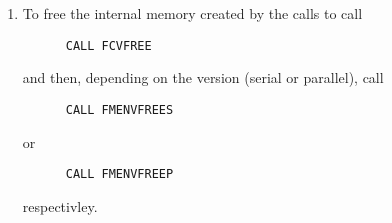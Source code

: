 \begin{enumerate}
\item
  To free the internal memory created by the calls to  call
\begin{verbatim}
      CALL FCVFREE
\end{verbatim}
  and then, depending on the {\nvector} version (serial or parallel), call
\begin{verbatim}
      CALL FMENVFREES
\end{verbatim}
  or
\begin{verbatim}
      CALL FMENVFREEP  
\end{verbatim}
  respectivley.

\end{enumerate}
